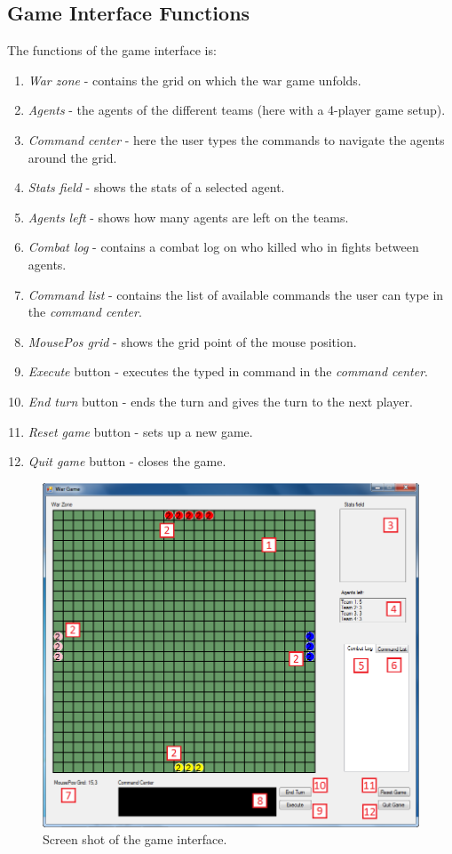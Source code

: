 \subsection*{Game Interface Functions}
The functions of the game interface is:
\begin{enumerate}
	\item \textit{War zone} - contains the grid on which the war game unfolds.
	\item \textit{Agents} - the agents of the different teams (here with a 4-player game setup).
	\item \textit{Command center} - here the user types the commands to navigate the agents around the grid.
	\item \textit{Stats field} - shows the stats of a selected agent.
	\item \textit{Agents left} - shows how many agents are left on the teams.
	\item \textit{Combat log} - contains a combat log on who killed who in fights between agents.
	\item \textit{Command list} - contains the list of available commands the user can type in the \textit{command center}.
	\item \textit{MousePos grid} - shows the grid point of the mouse position.
	\item \textit{Execute} button - executes the typed in command in the \textit{command center}.
	\item \textit{End turn} button - ends the turn and gives the turn to the next player.
	\item \textit{Reset game} button - sets up a new game.
	\item \textit{Quit game} button - closes the game.
\end{enumerate}

\begin{figure}[H]
\begin{center}
\includegraphics[scale=0.6]{Images/game_interface.png}
\end{center}
\caption{Screen shot of the game interface.}
\label{game_interface}
\end{figure}

